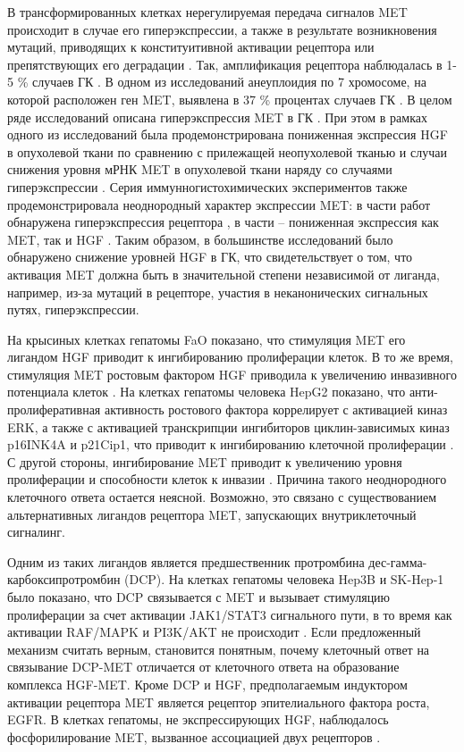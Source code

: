 В трансформированных клетках нерегулируемая передача сигналов MET происходит в случае его гиперэкспрессии, а также в результате возникновения мутаций, приводящих к конституитивной активации рецептора или препятствующих его деградации \cite{tovar_met_2017}. Так, амплификация рецептора наблюдалась в 1-5 \% случаев ГК \cite{takeo_examination_2001, kondo_clinical_2013, wang_genomic_2013}. В одном из исследований анеуплоидия по 7 хромосоме, на которой расположен ген MET, выявлена в 37 \% процентах случаев ГК \cite{kondo_clinical_2013}. В целом ряде исследований описана гиперэкспрессия MET в ГК \cite{boix_c-met_1994, suzuki_expression_1994, selden_expression_1994,daveau_hepatocyte_2003, noguchi_gene_1996}. При этом в рамках одного из исследований была продемонстрирована пониженная экспрессия HGF в опухолевой ткани по сравнению с прилежащей неопухолевой тканью и случаи снижения уровня мРНК MET в опухолевой ткани наряду со случаями гиперэкспрессии \cite{selden_expression_1994}. Серия иммунногистохимических экспериментов также продемонстрировала неоднородный характер экспрессии MET: в части работ обнаружена гиперэкспрессия рецептора \cite{kiss_analysis_1997, tavian_u-pa_2000}, в части – пониженная экспрессия как MET, так и HGF \cite{kiss_analysis_1997}. Таким образом, в большинстве исследований было обнаружено снижение уровней HGF в ГК, что свидетельствует о том, что активация MET должна быть в значительной степени независимой от лиганда, например, из-за мутаций в рецепторе, участия в неканонических сигнальных путях, гиперэкспрессии.

На крысиных клетках гепатомы FaO показано, что стимуляция MET его лигандом HGF приводит к ингибированию пролиферации клеток. В то же время, стимуляция MET ростовым фактором HGF приводила к увеличению инвазивного потенциала клеток \cite{shiota_hepatocyte_1992}. На клетках гепатомы человека HepG2 показано, что анти-пролиферативная активность ростового фактора коррелирует с активацией киназ ERK, а также с активацией транскрипции ингибиторов циклин-зависимых киназ  p16INK4A и p21Cip1, что приводит к ингибированию клеточной пролиферации \cite{shirako_up-regulation_2008}. С другой стороны, ингибирование MET приводит к увеличению уровня пролиферации и способности клеток к инвазии \cite{salvi_vitro_2007}. Причина такого неоднородного клеточного ответа остается неясной. Возможно, это связано с существованием альтернативных лигандов рецептора MET, запускающих внутриклеточный сигналинг. 

Одним из таких лигандов является предшественник протромбина дес-гамма-карбоксипротромбин (DCP). На клетках гепатомы человека Hep3B и SK-Hep-1 было показано, что DCP связывается с MET и вызывает стимуляцию пролиферации за счет активации JAK1/STAT3 сигнального пути, в то время как активации RAF/MAPK и PI3K/AKT не происходит \cite{suzuki_-gamma-carboxy_2005}. Если предложенный механизм считать верным, становится понятным, почему клеточный ответ на связывание DCP-MET отличается от клеточного ответа на образование комплекса HGF-MET. Кроме DCP и HGF, предполагаемым индуктором активации рецептора MET является рецептор эпителиального фактора роста, EGFR. В клетках гепатомы, не экспрессирующих HGF, наблюдалось фосфорилирование MET, вызванное ассоциацией двух рецепторов \cite{jo_cross-talk_2000}.

